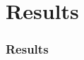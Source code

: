 \documentclass[10pt,presentation]{beamer}
\begin{document}
\section{Results}
\begin{frame}
  \frametitle{Results}

\end{frame}
\end{document}
